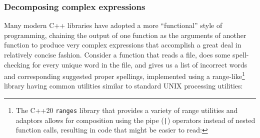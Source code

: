 \subsubsection[Decomposing complex expressions]{Decomposing complex expressions}\label{decomposing-complex-expressions}

Many modern C++ libraries have adopted a more ``functional'' style of
programming, chaining the output of one function as the arguments of
another function to produce very complex expressions that accomplish a
great deal in relatively concise fashion.
Consider a function that reads a file,
does some spell-checking for every unique word in the file, and gives us a
list of incorrect words and corresponding suggested proper spellings,
implemented using a range-like{\cprotect\footnote{The C++20 \lstinline!ranges! library that provides a variety of range utilities and adaptors allows for composition using the pipe (\lstinline!|!) operators instead of nested function calls, resulting in code that might be easier to read:

}} library having common utilities similar to
standard UNIX processing utilities:

